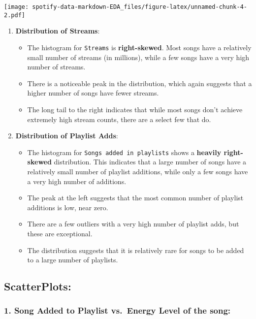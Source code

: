 \documentclass[
]{article}
\providecommand{\tightlist}{%
  \setlength{\itemsep}{0pt}\setlength{\parskip}{0pt}}
\begin{document}
\texttt{[image: spotify-data-markdown-EDA\_files/figure-latex/unnamed-chunk-4-2.pdf]}

\begin{enumerate}
\def\labelenumi{\arabic{enumi}.}
\tightlist
\item
  \textbf{Distribution of Streams}:

  \begin{itemize}
  \tightlist
  \item
    The histogram for \texttt{Streams} is \textbf{right-skewed}. Most
    songs have a relatively small number of streams (in millions), while
    a few songs have a very high number of streams.
  \item
    There is a noticeable peak in the distribution, which again suggests
    that a higher number of songs have fewer streams.
  \item
    The long tail to the right indicates that while most songs don't
    achieve extremely high stream counts, there are a select few that
    do.
  \end{itemize}
\item
  \textbf{Distribution of Playlist Adds}:

  \begin{itemize}
  \tightlist
  \item
    The histogram for \texttt{Songs\ added\ in\ playlists} shows a
    \textbf{heavily right-skewed} distribution. This indicates that a
    large number of songs have a relatively small number of playlist
    additions, while only a few songs have a very high number of
    additions.
  \item
    The peak at the left suggests that the most common number of
    playlist additions is low, near zero.
  \item
    There are a few outliers with a very high number of playlist adds,
    but these are exceptional.
  \item
    The distribution suggests that it is relatively rare for songs to be
    added to a large number of playlists.
  \end{itemize}
\end{enumerate}

\hypertarget{scatterplots}{%
\subsection{ScatterPlots:}\label{scatterplots}}

\hypertarget{song-added-to-playlist-vs.-energy-level-of-the-song}{%
\subsubsection{1. Song Added to Playlist vs.~Energy Level of the
song:}\label{song-added-to-playlist-vs.-energy-level-of-the-song}}
\end{document}

